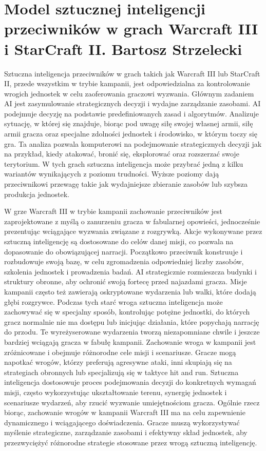 \section{Model sztucznej inteligencji przeciwników w grach Warcraft III i StarCraft II. Bartosz Strzelecki}
Sztuczna inteligencja przeciwników w grach takich jak Warcraft III lub StarCraft II, przede wszystkim w trybie kampanii,
jest odpowiedzialna za kontrolowanie wrogich jednostek w celu zaoferowania graczowi wyzwania. Głównym zadaniem AI jest zasymulowanie
strategicznych decyzji i wydajne zarządzanie zasobami.
AI podejmuje decyzję na podstawie predefiniowanych zasad i algorytmów. Analizuje sytuację, w której się znajduje, biorąc pod uwagę
siłę swojej własnej armii, siłę armii gracza oraz specjalne zdolności jednostek i środowisko, w którym toczy się gra.
Ta analiza pozwala komputerowi na podejmowanie strategicznych decyzji jak na przykład, kiedy atakować, bronić się, eksplorować oraz rozszerzać swoje terytorium.
W tych grach sztuczna inteligencja może przybrać jedną z kilku wariantów wynikających z poziomu trudności. Wyższe poziomy
dają przeciwnikowi przewagę takie jak wydajniejsze zbieranie zasobów lub szybsza produkcja jednostek.

W grze Warcraft III w trybie kampanii zachowanie przeciwników jest zaprojektowane z myślą o zanurzeniu gracza w fabularnej opowieści, jednocześnie
prezentując wciągające wyzwania związane z rozgrywką. Akcje wykonywane przez sztuczną inteligencję są dostosowane do celów danej misji, co pozwala
na dopasowanie do obowiązującej narracji.
Początkowo przeciwnik konstruuje i rozbudowuje swoją bazę, w celu zgromadzenia odpowiedniej liczby zasobów, szkolenia jednostek i prowadzenia badań.
AI strategicznie rozmieszcza budynki i struktury obronne, aby ochronić swoją fortecę przed najazdami gracza. 
Misje kampanii często też zawierają oskryptowane wydarzenia lub walki, które dodają głębi rozgrywce. Podczas tych starć wroga sztuczna inteligencja
może zachowywać się w specjalny sposób, kontrolując potężne jednostki, do których gracz normalnie nie ma dostępu lub inicjując działania, które popychają
narrację do przodu. Te wyreżyserowane wydarzenia tworzą niezapomniane chwile i jeszcze bardziej wciągają gracza w fabułę kampanii.
Zachowanie wroga w kampanii jest zróżnicowane i obejmuje różnorodne cele misji i scenariusze. Gracze mogą napotkać wrogów, którzy preferują agresywne ataki,
inni skupiają się na strategiach obronnych lub specjalizują się w taktyce hit and run. Sztuczna inteligencja dostosowuje proces podejmowania decyzji do
konkretnych wymagań misji, często wykorzystując ukształtowanie terenu, synergię jednostek i scenariusze wydarzeń, aby rzucić wyzwanie umiejętnościom gracza.
Ogólnie rzecz biorąc, zachowanie wrogów w kampanii Warcraft III ma na celu zapewnienie dynamicznego i wciągającego doświadczenia. Gracze muszą 
wykorzystywać myślenie strategiczne, zarządzanie zasobami i efektywny skład jednostek, aby przezwyciężyć różnorodne strategie stosowane przez wrogą sztuczną inteligencję.
